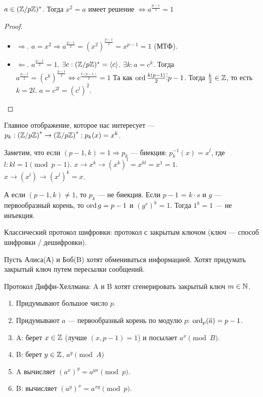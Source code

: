 \begin{theorem}
    $a \in (\mathbb{Z} / p \mathbb{Z})^*$. Тогда  $x^2 = a$ имеет решение  $\iff a^{\frac{p-1}{2}} = 1$
\end{theorem}
\begin{proof}
    \slashn
    \begin{itemize}
        \item $\Rightarrow$.  $a = x^2 \Rightarrow a^{\frac{p-1}{2}} = (x^2)^{\frac{p-1}{2}} = x^{p-1} = 1$ (МТФ).
        \item $\Leftarrow$.  $a^{\frac{p-1}{2}} = 1$. $\exists c: (\mathbb{Z} / p \mathbb{Z})^* = \langle c \rangle$.  $\exists k: a = c^k$. Тогда  $a^{\frac{p-1}{2}} = (c^k)^{\frac{p-1}{2}} \iff c^{\frac{k(p-1)}{2}} = 1$ Та как $\operatorname{ord} \frac{k(p-1)}{2} \vdots p - 1$. Тогда  $\frac{k}{2}\in \mathbb{Z}$, то есть $k = 2l$.  $a = c^{2l} = (c^l)^2$.
    \end{itemize}
\end{proof}
Главное отображение, которое нас интересует --- $p_k: \left(\mathbb{Z} / p\mathbb{Z}\right)^* \to \left(\mathbb{Z} / p\mathbb{Z}\right)^*: p_k(x) = x^k$.

Заметим, что если  $(p - 1,k)=1 \Rightarrow p_k$ --- биекция:  $p_k^{-1}(x) = x^l$, где  $l: kl = 1 \pmod{p-1}$.  $x\to x^k\to(x^k)^l = x^{kl} = x^1 = 1$. $x\to (x^l) \to (x^l)^k = x$.

А если $(p - 1, k) \neq 1$, то $p_k$ --- не биекция. Если  $p - 1$ =  $k \cdot s$ и  $g$ --- первообразный корень, то  $\operatorname{ord} g = p - 1$ и $(g^s)^k = 1$. Тогда  $1^k=1$ --- не инъекция.

Классический протокол шифровки: протокол с закрытым ключом (ключ --- способ шифровки / дешифровки).

Пусть Алиса(А) и Боб(B) хотят обмениваться информацией. Хотят придумать закрытый ключ путем пересылки сообщений. 

Протокол Диффи-Хеллмана: A и B хотят сгенерировать закрытый ключ $m \in \mathbb{N}$.
 \begin{enumerate}
     \item Придумывают большое число $p$.
     \item Придумывают  $a$ --- первообразный корень по модулю  $p$:  $\operatorname{ord}_p(\overline{a}) = p - 1$.
     \item A: берет  $x \in \mathbb{Z}$ (лучше $(x, p - 1) = 1$) и посылает $a^x \pmod{B}$.
     \item B: берет $y \in \mathbb{Z}$,  $a^y \pmod{A}$ 
     \item A вычисляет $\left(a^x\right)^y = a^{yx} \pmod p$.
     \item B: вычисляет $(a^y)^x = a^{xy} \pmod p$.
\end{enumerate}

